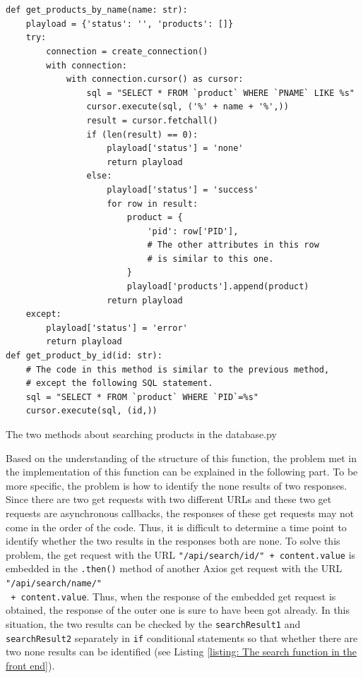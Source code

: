 \documentclass{article}
\begin{document}
\\\\
\begin{listing}[!htp]
\begin{verbatim}
def get_products_by_name(name: str):
    playload = {'status': '', 'products': []}
    try:
        connection = create_connection()
        with connection:
            with connection.cursor() as cursor:
                sql = "SELECT * FROM `product` WHERE `PNAME` LIKE %s"
                cursor.execute(sql, ('%' + name + '%',))
                result = cursor.fetchall()
                if (len(result) == 0):
                    playload['status'] = 'none'
                    return playload
                else:
                    playload['status'] = 'success'
                    for row in result:
                        product = {
                            'pid': row['PID'],
                            # The other attributes in this row 
                            # is similar to this one.
                        }
                        playload['products'].append(product)
                    return playload
    except:
        playload['status'] = 'error'
        return playload
def get_product_by_id(id: str):
    # The code in this method is similar to the previous method, 
    # except the following SQL statement.
    sql = "SELECT * FROM `product` WHERE `PID`=%s"
    cursor.execute(sql, (id,))
\end{verbatim}
\caption{The two methods about searching products in the database.py}
\label{listing: The two methods about searching products in the database.py}
\end{listing}Based on the understanding of the structure of this function, the problem met in the implementation of this function can be explained in the following part. To be more specific, the problem is how to identify the none results of two responses. Since there are two get requests with two different URLs and these two get requests are asynchronous callbacks, the responses of these get requests may not come in the order of the code. Thus, it is difficult to determine a time point to identify whether the two results in the responses both are none. To solve this problem, the get request with the URL \verb|"/api/search/id/" + content.value| is embedded in the \verb|.then()| method of another Axios get request with the URL \verb|"/api/search/name/"|\\\verb| + content.value|. Thus, when the response of the embedded get request is obtained, the response of the outer one is sure to have been got already. In this situation, the two results can be checked by the \verb|searchResult1| and \verb|searchResult2| separately in \verb|if| conditional statements so that whether there are two none results can be identified (see Listing \ref{listing: The search function in the front end}).
\newpage
\end{document}
